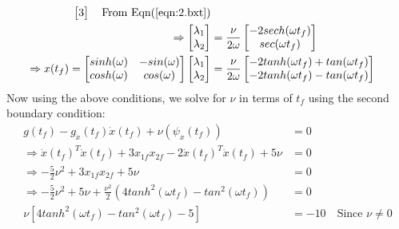 \begin{enumerate}
\begin{enumerate}
\begin{align*}
\begin{bmatrix}
		3 
		\end{bmatrix} \quad \text{From Eqn(\ref{eqn:2.bxt})}\\
	\Rightarrow 
		\begin{bmatrix}
		 \lambda_1\\
		 \lambda_2 \\
		 \end{bmatrix} &= \frac{\nu}{2 \omega}
		 \begin{bmatrix}
		  -2 sech(\omega t_f)\\
		  sec(\omega t_f) \\
		 \end{bmatrix}\\
	\Rightarrow x(t_f) = 
			  \begin{bmatrix}
			    sinh(\omega) & -sin(\omega)\\
			    cosh(\omega) & cos(\omega) \\
			  \end{bmatrix} 
			  \begin{bmatrix}
                          \lambda_1 \\
			  \lambda_2 \\
                         \end{bmatrix} &=  \frac{\nu}{2 \omega}
			 \begin{bmatrix}
			  -2tanh(\omega t_f) + tan(\omega t_f)\\
			  -2tanh(\omega t_f) - tan(\omega t_f)\\
			 \end{bmatrix}
    \end{align*}
    Now using the above conditions, we solve for $\nu$ in terms of $t_f$ using the second boundary condition:
    \begin{align*}
   g(t_f) - g_{\dot x}(t_f) \dot x(t_f) + \nu (\psi_x(t_f)) &= 0 \\
   \Rightarrow \dot{x}(t_f)^{T} \dot{x}(t_f)+ 3 x_{1f} x_{2f} - 2 \dot{x}(t_f)^{T} \dot{x}(t_f) + 5\nu &= 0\\
   \Rightarrow -\frac{5}{2}\nu^2 + 3 x_{1f} x_{2f} + 5\nu &= 0\\
   \Rightarrow -\frac{5}{2}\nu^2 + 5\nu + \frac{ \nu^2}{2} (4 tanh^2(\omega t_f) - tan^2(\omega t_f)) &= 0\\
   \nu \left[ 4 tanh^2(\omega t_f) - tan^2(\omega t_f) -5 \right] &= -10\quad \text{Since } \nu \neq 0 \\

\end{align*}
\end{enumerate}
\end{enumerate}
